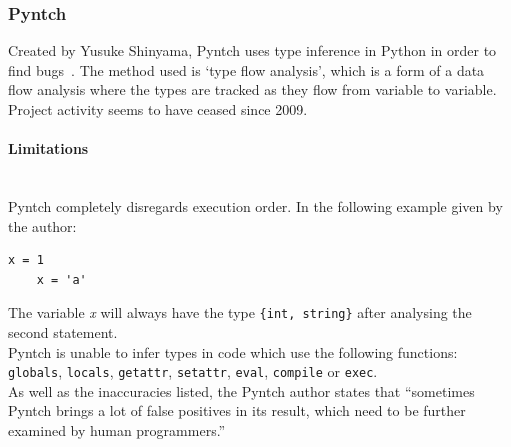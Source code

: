 \documentclass[12pt, titlepage]{article}
\begin{document}
\subsubsection{Pyntch}
Created by Yusuke Shinyama, Pyntch uses type inference in Python in order to find bugs~\cite{pyntch}. The method used is `type flow analysis', which is a form of a data flow analysis where the types are tracked as they flow from variable to variable. Project activity seems to have ceased since 2009.
\paragraph{Limitations}\mbox{}\\
Pyntch completely disregards execution order. In the following example given by the author:
\begin{lstlisting}[mathescape]
    x = 1
    x = 'a'
\end{lstlisting}
The variable \textit{x} will always have the type \texttt{\{int, string\}} after analysing the second statement. \\
\indent Pyntch is unable to infer types in code which use the following functions: \texttt{globals},  \texttt{locals},  \texttt{getattr},  \texttt{setattr},  \texttt{eval},  \texttt{compile} or  \texttt{exec}. \\
\indent As well as the inaccuracies listed, the Pyntch author states that ``sometimes Pyntch brings a lot of false positives in its result, which need to be further examined by human programmers.''

\end{document}
